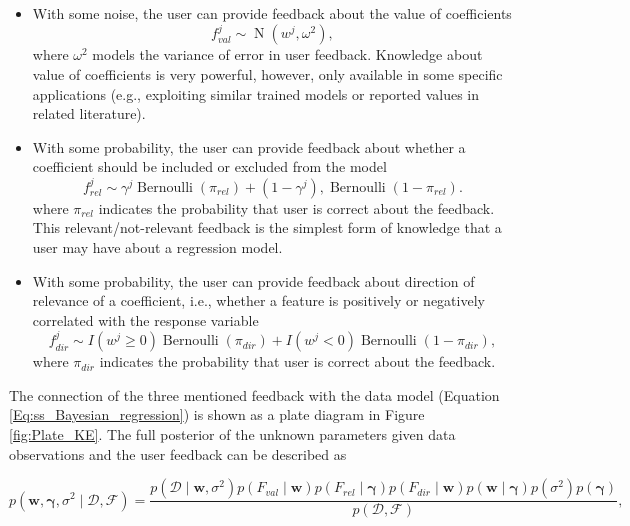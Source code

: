 \documentclass[dissertation,math,vertlayout,pdfa,colorlinks]{aaltoseries}
\newcommand{\bw}{\bm{w}}
\newcommand{\bD}{\mathcal{D}}
\newcommand{\bF}{\mathcal{F}}
\DeclareMathOperator{\bernoullipdf}{Bernoulli}
\DeclareMathOperator{\normalpdf}{N}
\begin{document}
\begin{itemize}
	\item With some noise, the user can provide feedback about the value of coefficients
	\begin{equation}\label{Eq:fb_on_val_coeff}
	f_{val}^{j} \sim \normalpdf(w^j, \omega^2),
	\end{equation}
	\noindent where $\omega^2$ models the variance of error in user feedback. Knowledge about value of coefficients is very powerful, however, only available in some specific applications (e.g., exploiting similar trained models or reported values in related literature). 
	\item With some probability, the user can provide feedback about whether a coefficient should be included or excluded from the model
	\begin{equation}\label{Eq:fb_on_rel_coeff}
	f_{rel}^{j} \sim \gamma^j \bernoullipdf(\pi_{rel}) + (1 - \gamma^j), \bernoullipdf(1 - \pi_{rel}).
	\end{equation}
	\noindent where $\pi_{rel}$ indicates the probability that user is correct about the feedback. This relevant/not-relevant feedback is the simplest form of knowledge that a user may have about a regression model. 
	\item With some probability, the user can provide feedback about direction of relevance of a coefficient, i.e., whether a feature is positively or negatively correlated with the response variable
	\begin{equation}\label{Eq:fb_on_dir_coeff}
	f_{dir}^{j} \sim I(w^j \geq 0) \bernoullipdf(\pi_{dir}) + I(w^j < 0) \bernoullipdf(1 - \pi_{dir}),
	\end{equation}
	\noindent where $\pi_{dir}$ indicates the probability that user is correct about the feedback.
\end{itemize}



The connection of the three mentioned feedback with the data model (Equation \ref{Eq:ss_Bayesian_regression}) is shown as a plate diagram in Figure \ref{fig:Plate_KE}. The full posterior of the unknown parameters given data observations and the user feedback can be described as 

\begin{equation}\label{Eq:Bayes_rule_ss_reg_with_fb}
p(\bw, \bm{\gamma}, \sigma^2 \mid \bD,\bF) = \frac{p(\bD \mid \bw, \sigma^2)p(F_{val} \mid \bw)p(F_{rel} \mid \bm{\gamma})p(F_{dir} \mid \bw)p(\bw \mid \bm{\gamma})p(\sigma^2)p(\bm{\gamma})}{p(\bD,\bF)},
\end{equation} 
\end{document}
